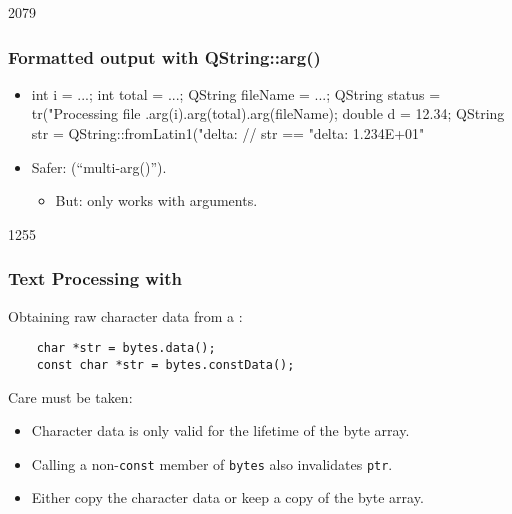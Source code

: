 \begin{slide}[fragile]{2079}
\frametitle{Formatted output with QString::arg()}
\begin{itemize}
\item[]
\begin{cpp}
int i = ...;
int total = ...;
QString fileName = ...;
QString status = tr("Processing file %
                .arg(i).arg(total).arg(fileName);
double d = 12.34;
QString str = QString::fromLatin1("delta: %
// str == "delta: 1.234E+01"               
\end{cpp}\medskip

\item Safer:  (``multi-arg()'').
  \begin{itemize}
  \item But: only works with  arguments.
  \end{itemize}
\end{itemize}
\end{slide}

\begin{slide}[fragile]{1255}\frametitle{Text Processing with }
  Obtaining raw character data from a :
  
  \begin{lstlisting}
    char *str = bytes.data();
    const char *str = bytes.constData();
  \end{lstlisting}
  
  Care must be taken:
  \begin{itemize}
  \item Character data is only valid for the lifetime of the byte array.
  \item Calling a non-\texttt{const} member of \texttt{bytes} also invalidates \texttt{ptr}.
  \item Either copy the character data or keep a copy of the byte array.
  \end{itemize}
\end{slide}

